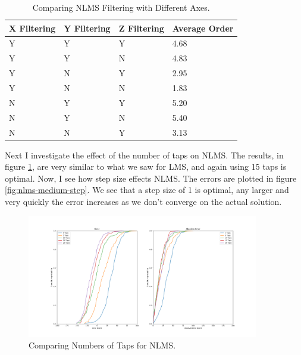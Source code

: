 \documentclass[12pt,a4paper,twoside,openright]{report}
\begin{document}
\begin{table}[]
\centering
\caption{Comparing NLMS Filtering with Different Axes.}
\label{table:nlms-errors}
\begin{tabular}{|l|l|l|l|}
\hline
X Filtering & Y Filtering & Z Filtering & Average Order \\ \hline
Y           & Y           & Y           & 4.68          \\
Y           & Y           & N           & 4.83          \\
Y           & N           & Y           & 2.95          \\
Y           & N           & N           & 1.83          \\
N           & Y           & Y           & 5.20          \\
N           & Y           & N           & 5.40          \\
N           & N           & Y           & 3.13          \\
\hline
\end{tabular}
\end{table}

Next I investigate the effect of the number of taps on NLMS. The results, in
figure \ref{fig:nlms-medium-taps}, are very similar to what we saw for LMS, and
again using 15 taps is optimal.
Now, I see how step size effects NLMS. The errors are plotted in
figure \ref{fig:nlms-medium-step}. We see that a step size of 1 is optimal,
any larger and very quickly the error increases as we don't converge on the
actual solution.

\begin{figure}[H]
	\centerline{\includegraphics[width=0.9\textwidth]{figs/nlms-taps-error-medium-noise.png}}
	\caption{Comparing Numbers of Taps for NLMS.}
	\label{fig:nlms-medium-taps}
\end{figure}
\end{document}
